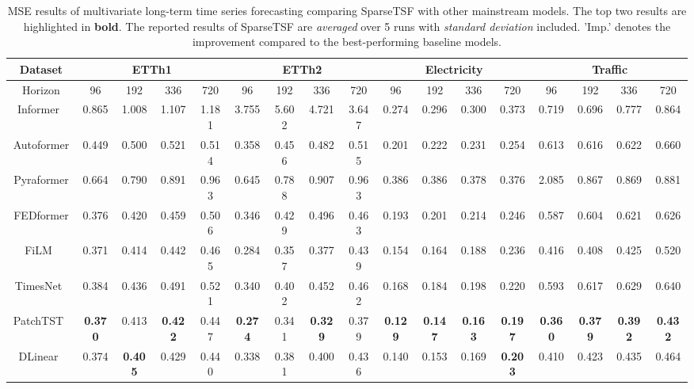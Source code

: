 \begin{table}[!htb]
\centering
\caption{MSE results of multivariate long-term time series forecasting comparing SparseTSF with other mainstream models. The top two results are highlighted in \textbf{bold}. The reported results of SparseTSF are \textit{averaged} over 5 runs with \textit{standard deviation} included. 'Imp.' denotes the improvement compared to the best-performing baseline models.}
\label{main_reslut}
\begin{adjustbox}{max width=\linewidth}
\begin{tabular}{@{}c|cccc|cccc|cccc|cccc@{}}
\toprule
Dataset & \multicolumn{4}{c|}{ETTh1} & \multicolumn{4}{c|}{ETTh2} & \multicolumn{4}{c|}{Electricity} & \multicolumn{4}{c}{Traffic} \\ \midrule
Horizon & 96 & 192 & 336 & 720 & 96 & 192 & 336 & 720 & 96 & 192 & 336 & 720 & 96 & 192 & 336 & 720 \\ \midrule
Informer~\citeyearpar{informer} & 0.865 & 1.008 & 1.107 & 1.181 & 3.755 & 5.602 & 4.721 & 3.647 & 0.274 & 0.296 & 0.300 & 0.373 & 0.719 & 0.696 & 0.777 & 0.864 \\
Autoformer~\citeyearpar{autoformer} & 0.449 & 0.500 & 0.521 & 0.514 & 0.358 & 0.456 & 0.482 & 0.515 & 0.201 & 0.222 & 0.231 & 0.254 & 0.613 & 0.616 & 0.622 & 0.660 \\
Pyraformer~\citeyearpar{pyraformer} & 0.664 & 0.790 & 0.891 & 0.963 & 0.645 & 0.788 & 0.907 & 0.963 & 0.386 & 0.386 & 0.378 & 0.376 & 2.085 & 0.867 & 0.869 & 0.881 \\
FEDformer~\citeyearpar{fedformer} & 0.376 & 0.420 & 0.459 & 0.506 & 0.346 & 0.429 & 0.496 & 0.463 & 0.193 & 0.201 & 0.214 & 0.246 & 0.587 & 0.604 & 0.621 & 0.626 \\
FiLM~\citeyearpar{film} & 0.371 & 0.414 & 0.442 & 0.465 & 0.284 & 0.357 & 0.377 & 0.439 & 0.154 & 0.164 & 0.188 & 0.236 & 0.416 & 0.408 & 0.425 & 0.520 \\
TimesNet~\citeyearpar{timesnet} & 0.384 & 0.436 & 0.491 & 0.521 & 0.340 & 0.402 & 0.452 & 0.462 & 0.168 & 0.184 & 0.198 & 0.220 & 0.593 & 0.617 & 0.629 & 0.640 \\
PatchTST~\citeyearpar{patchtst} & \textbf{0.370} & 0.413 & \textbf{0.422} & 0.447 & \textbf{0.274} & 0.341 & \textbf{0.329} & 0.379 & \textbf{0.129} & \textbf{0.147} & \textbf{0.163} & \textbf{0.197} & \textbf{0.360} & \textbf{0.379} & \textbf{0.392} & \textbf{0.432} \\
DLinear~\citeyearpar{dlinear} & 0.374 & \textbf{0.405} & 0.429 & 0.440 & 0.338 & 0.381 & 0.400 & 0.436 & 0.140 & 0.153 & 0.169 & \textbf{0.203} & 0.410 & 0.423 & 0.435 & 0.464 \\

\end{tabular}
\end{adjustbox}
\end{table}
